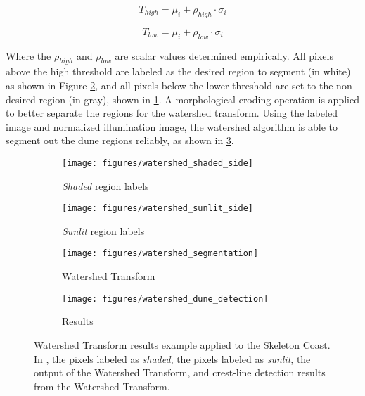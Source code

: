 \begin{equation}
T_{high}=\mu_{i}+\rho_{high}\cdot\sigma_{i}
\end{equation}

\begin{equation}
T_{low}=\mu_{i}+\rho_{low}\cdot\sigma_{i}
\end{equation}

Where the $\rho_{high}$ and $\rho_{low}$ are scalar values determined empirically. All pixels above the high threshold are labeled as the desired region to segment (in white) as shown in Figure \ref{fig:watershed_sunlit_side}, and all pixels below the lower threshold are set to the non-desired region (in gray), shown in \ref{fig:watershed_shaded_side}. A morphological eroding operation is applied to better separate the regions for the watershed transform. Using the labeled image and normalized illumination image, the watershed algorithm is able to segment out the dune regions reliably, as shown in \ref{fig:watershed_segmentation}. 

 \begin{figure}
 	\centering
 	\begin{subfigure}{0.48\textwidth}
 		\centering
 		\texttt{[image: figures/watershed\_shaded\_side]}
 		\caption{\emph{Shaded} region labels}
 		\label{fig:watershed_shaded_side}
 	\end{subfigure}
 	\begin{subfigure}{0.48\textwidth}
 		\centering
 		\texttt{[image: figures/watershed\_sunlit\_side]}
 		\caption{\emph{Sunlit} region labels}
 		\label{fig:watershed_sunlit_side}
 	\end{subfigure}
 	\begin{subfigure}{0.48\textwidth}
 		\centering
 		\texttt{[image: figures/watershed\_segmentation]}
 		\caption{Watershed Transform}
 		\label{fig:watershed_segmentation}
 	\end{subfigure}
 	\begin{subfigure}{0.48\textwidth}
 		\centering
 		\texttt{[image: figures/watershed\_dune\_detection]}
 		\caption{Results}
 		\label{fig:watershed_dune_detection}
 	\end{subfigure} 
 	\caption{Watershed Transform results example applied to the Skeleton Coast. In , the pixels labeled as \emph{shaded},  the pixels labeled as \emph{sunlit},  the output of the Watershed Transform, and  crest-line detection results from the Watershed Transform. }
 	\label{fig:watershed_results}
 \end{figure}

